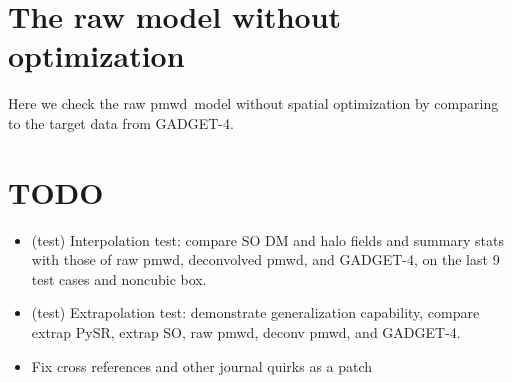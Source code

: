 \documentclass[modern, trackchanges, dvipsnames]{aastex631}
\newcommand{\pmwd}{{\usefont{T1}{nova}{m}{sl}pmwd}}
\newcommand{\GADGET}{{{\fontsize{10pt}{12pt}\selectfont GADGET}-4}}
\begin{document}
\section{The raw model without optimization}
Here we check the raw \pmwd\ model without spatial optimization by
comparing to the target data from \GADGET.






\section*{TODO}
\begin{itemize}
\item (test) Interpolation test: compare SO DM and halo fields and
  summary stats with those of raw pmwd, deconvolved pmwd, and \GADGET,
  on the last 9 test cases and noncubic box.
\item (test) Extrapolation test: demonstrate generalization capability,
  compare extrap PySR, extrap SO, raw pmwd, deconv pmwd, and \GADGET.
\item Fix cross references and other journal quirks as a patch
\end{itemize}
\end{document}

